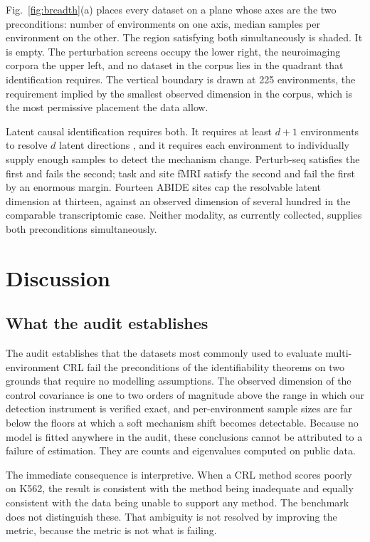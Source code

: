 \documentclass[journal,twoside,web]{ieeecolor}
\begin{document}
Fig.~\ref{fig:breadth}(a) places every dataset on a plane whose axes are the
two preconditions: number of environments on one axis, median samples per
environment on the other. The region satisfying both simultaneously is shaded.
It is empty. The perturbation screens occupy the lower right, the neuroimaging
corpora the upper left, and no dataset in the corpus lies in the quadrant that
identification requires. The vertical boundary is drawn at 225 environments,
the requirement implied by the smallest observed dimension in the corpus,
which is the most permissive placement the data allow.

Latent causal identification requires both. It requires at least $d+1$
environments to resolve $d$ latent directions \cite{rajendran2024}, and it
requires each environment to individually supply enough samples to detect the
mechanism change. Perturb-seq satisfies the first and fails the second; task
and site fMRI satisfy the second and fail the first by an enormous margin.
Fourteen ABIDE sites cap the resolvable latent dimension at thirteen, against
an observed dimension of several hundred in the comparable transcriptomic
case. Neither modality, as currently collected, supplies both preconditions
simultaneously.

\section{Discussion}
\label{sec:discussion}

\subsection{What the audit establishes}
The audit establishes that the datasets most commonly used to evaluate
multi-environment CRL fail the preconditions of the identifiability theorems
on two grounds that require no modelling assumptions. The observed dimension
of the control covariance is one to two orders of magnitude above the range in
which our detection instrument is verified exact, and per-environment sample
sizes are far below the floors at which a soft mechanism shift becomes
detectable. Because no model is fitted anywhere in the audit, these
conclusions cannot be attributed to a failure of estimation. They are counts
and eigenvalues computed on public data.

The immediate consequence is interpretive. When a CRL method scores poorly on
K562, the result is consistent with the method being inadequate and equally
consistent with the data being unable to support any method. The benchmark
does not distinguish these. That ambiguity is not resolved by improving the
metric, because the metric is not what is failing.
\end{document}
